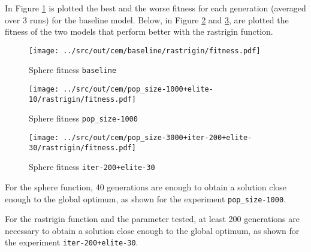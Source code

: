 In Figure \ref{fig:cem-r-fitness/baseline} is plotted the best and the worse fitness for each generation (averaged over 3 runs) for the baseline model. Below, in Figure \ref{fig:cem-r-fitness/1000} and \ref{fig:cem-r-fitness/200}, are plotted the fitness of the two models that perform better with the rastrigin function.

\begin{figure}[H]
	\centering
	\begin{minipage}[b]{.6\textwidth}
		\texttt{[image: ../src/out/cem/baseline/rastrigin/fitness.pdf]}	
	\end{minipage}
	\caption{Sphere fitness \texttt{baseline}}
	\label{fig:cem-r-fitness/baseline}
\end{figure}
\begin{figure}[htb]
	\centering
	\begin{minipage}[b]{.6\textwidth}
		\texttt{[image: ../src/out/cem/pop\_size-1000+elite-10/rastrigin/fitness.pdf]}	
	\end{minipage}
	\caption{Sphere fitness \texttt{pop\_size-1000}}
	\label{fig:cem-r-fitness/1000}
\end{figure}
\begin{figure}[htb]
	\centering	
	\begin{minipage}[b]{.6\textwidth}
		\texttt{[image: ../src/out/cem/pop\_size-3000+iter-200+elite-30/rastrigin/fitness.pdf]}	
	\end{minipage}
	\caption{Sphere fitness \texttt{iter-200+elite-30}}
	\label{fig:cem-r-fitness/200}
\end{figure}

\bigskip
For the sphere function, 40 generations are enough to obtain a solution close enough to the global optimum, as shown for the experiment \texttt{pop\_size-1000}.

For the rastrigin function and the parameter tested, at least 200 generations are necessary to obtain a solution close enough to the global optimum, as shown for the experiment \texttt{iter-200+elite-30}.